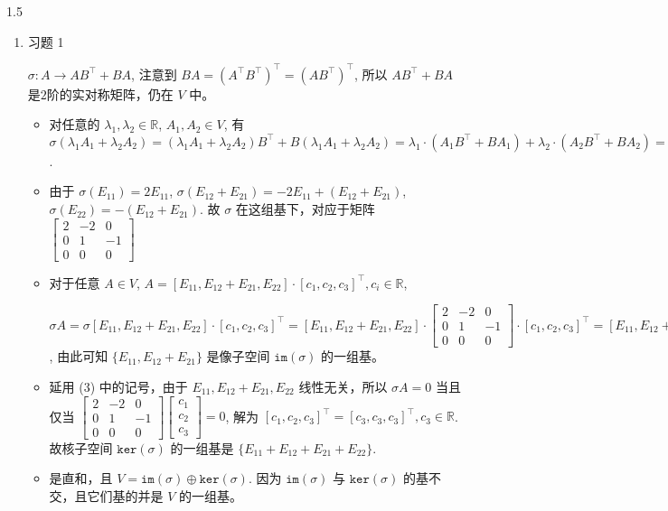 \documentclass{article}
\begin{document}
\begin{spacing}{1.5}
\begin{enumerate}
    \item [1.] 习题 1
    
        $\sigma: A \to AB^\top + BA$, 注意到 $BA = (A^\top B^\top)^\top = (AB^\top)^\top$, 所以  $AB^\top + BA$ 是$2$阶的实对称矩阵，仍在 $V$ 中。 

        \begin{itemize}
            \item [(1)] 对任意的 $\lambda_1, \lambda_2 \in\mathbb{R}$, $A_1, A_2\in V$, 有 $\sigma(\lambda_1 A_1 + \lambda_2 A_2) = (\lambda_1 A_1 + \lambda_2 A_2) B^\top + B(\lambda_1 A_1 + \lambda_2 A_2)= \lambda_1\cdot(A_1B^\top + BA_1) + \lambda_2\cdot (A_2B^\top + BA_2) = \lambda_1 \sigma(A_1) + \lambda_2 \sigma(A_2)$.
            \item [(2)] 由于 $\sigma(E_{11}) = 2E_{11}$, $\sigma(E_{12} + E_{21}) = -2 E_{11} + (E_{12} + E_{21})$, $\sigma(E_{22}) = - (E_{12} + E_{21})$. 故 $\sigma$ 在这组基下，对应于矩阵 $\left[\begin{array}{ccc}2&-2&0\\0&1&-1\\0&0&0\end{array}\right]$
            \item [(3)] 对于任意 $A\in V$, $A = [E_{11}, E_{12} + E_{21}, E_{22}]\cdot [c_1, c_2, c_3]^\top, c_i\in\mathbb{R}$,
            
            $\sigma A = \sigma[E_{11}, E_{12} + E_{21}, E_{22}] \cdot [c_1, c_2, c_3]^\top = [E_{11}, E_{12} + E_{21}, E_{22}] \cdot \left[\begin{array}{ccc}2&-2&0\\0&1&-1\\0&0&0\end{array}\right]\cdot [c_1, c_2, c_3]^\top = [E_{11}, E_{12} + E_{21}, E_{22}]\cdot \left[2c_1 - 2c_2, c_2 - c_3, 0\right]^\top$, 由此可知 $\{E_{11}, E_{12} + E_{21}\}$ 是像子空间 $\mathtt{im}(\sigma)$ 的一组基。
            
            \item [(4)] 延用 (3) 中的记号，由于 $E_{11}, E_{12} + E_{21}, E_{22}$ 线性无关，所以 $\sigma A = 0$ 当且仅当 $\left[\begin{array}{ccc}2&-2&0\\0&1&-1\\0&0&0\end{array}\right] \left[\begin{array}{c}c_1\\c_2\\c_3\end{array}\right] = 0$, 解为 $[c_1, c_2, c_3]^\top = [c_3, c_3, c_3]^\top, c_3\in\mathbb{R}$. 故核子空间 $\mathtt{ker}(\sigma)$ 的一组基是 $\{E_{11} + E_{12} + E_{21} + E_{22}\}$.
            \item [(5)] 是直和，且 $V = \mathtt{im}(\sigma) \oplus \mathtt{ker}(\sigma)$. 因为 $\mathtt{im} (\sigma)$ 与 $\mathtt{ker}(\sigma)$ 的基不交，且它们基的并是 $V$ 的一组基。
        \end{itemize}


\end{enumerate}
\end{spacing}
\end{document}
